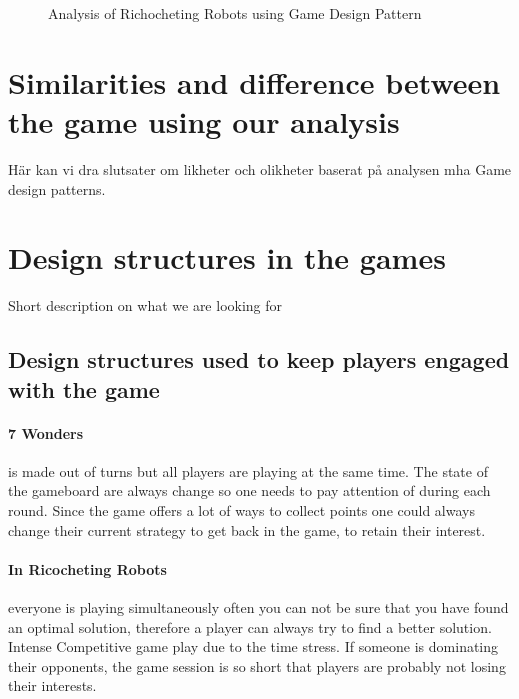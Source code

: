 \documentclass[a4paper]{article}
\begin{document}
\begin{figure}

  \caption{Analysis of Richocheting Robots using Game Design Pattern} 
  \label{fig:RRW}
\end{figure}

\section{Similarities and difference between the game using our analysis}
  Här kan vi dra slutsater om likheter och olikheter baserat på analysen mha Game design patterns. 

\section{Design structures in the games}
Short description on what we are looking for

\subsection{Design structures used to keep players engaged with the game}
\paragraph{7 Wonders} is made out of turns but all players are playing at the same time. The state of the gameboard are always change so one needs to pay attention of during each round. Since the game offers a lot of ways to collect points one could always change their current strategy to get back in the game, to retain their interest.

\paragraph{In Ricocheting Robots} everyone is playing simultaneously often you can not be sure that you have found an optimal solution, therefore a player can always try to find a better solution. Intense Competitive game play due to the time stress. If someone is dominating their opponents, the game session is so short that players are probably not losing their interests.
\end{document}
